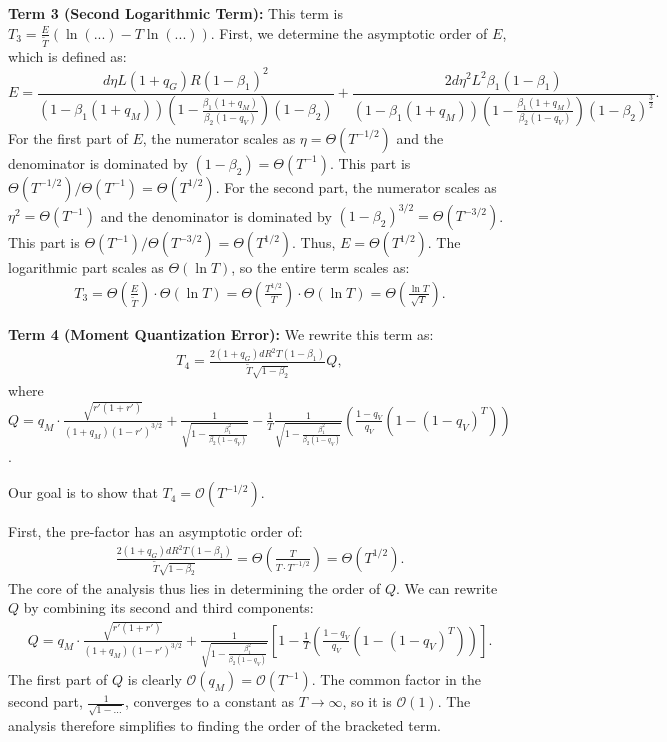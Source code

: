 \documentclass[11pt, letterpaper]{article}
\begin{document}
\textbf{Term 3 (Second Logarithmic Term):} This term is $T_3 = \frac{E}{\tilde{T}}\left(\ln(...) - T\ln(...)\right)$.
First, we determine the asymptotic order of $E$, which is defined as:
$$E=\frac{d\eta L(1+q_G)R(1-\beta_1)^2}{(1 - \beta_1(1+q_M))(1 - \frac{\beta_1(1+q_M)}{\beta_2(1-q_V)})(1-\beta_2)}+\frac{2d\eta^2 L^2 \beta_1(1-\beta_1)}{(1 - \beta_1(1+q_M))(1 - \frac{\beta_1(1+q_M)}{\beta_2(1-q_V)})(1-\beta_2)^{\frac{3}{2}}}.$$
For the first part of $E$, the numerator scales as $\eta=\Theta(T^{-1/2})$ and the denominator is dominated by $(1-\beta_2)=\Theta(T^{-1})$. This part is $\Theta(T^{-1/2}) / \Theta(T^{-1}) = \Theta(T^{1/2})$. For the second part, the numerator scales as $\eta^2=\Theta(T^{-1})$ and the denominator is dominated by $(1-\beta_2)^{3/2}=\Theta(T^{-3/2})$. This part is $\Theta(T^{-1}) / \Theta(T^{-3/2}) = \Theta(T^{1/2})$. Thus, $E = \Theta(T^{1/2})$. The logarithmic part scales as $\Theta(\ln T)$, so the entire term scales as:
\begin{align*}
    T_3 = \Theta\left(\frac{E}{\tilde{T}}\right) \cdot \Theta(\ln T) = \Theta\left(\frac{T^{1/2}}{T}\right) \cdot \Theta(\ln T) = \Theta\left(\frac{\ln T}{\sqrt{T}}\right).
\end{align*}

\textbf{Term 4 (Moment Quantization Error):} We rewrite this term as:
\begin{align}\label{eq:QT_cal}
    T_4 = \frac{2(1+q_G)dR^2T(1-\beta_1)}{\tilde{T}\sqrt{1-\beta_2}}Q,
\end{align}
where $Q= q_M \cdot \frac{\sqrt{r'(1+r')}}{(1+q_M)(1-r')^{3/2}} + \frac{1}{\sqrt{1-\frac{\beta_1^2}{\beta_2(1-q_V)}}}-\frac{1}{T}\frac{1}{\sqrt{1-\frac{\beta_1^2}{\beta_2(1-q_V)}}} \left( \frac{1-q_V}{q_V}(1-(1-q_V)^T) \right)$.

Our goal is to show that $T_4 = \mathcal{O}(T^{-1/2})$.

First, the pre-factor has an asymptotic order of:
\begin{align*}
    \frac{2(1+q_G)dR^2T(1-\beta_1)}{\tilde{T}\sqrt{1-\beta_2}} = \Theta\left(\frac{T}{T \cdot T^{-1/2}}\right) = \Theta(T^{1/2}).
\end{align*}
The core of the analysis thus lies in determining the order of $Q$. We can rewrite $Q$ by combining its second and third components:
\begin{align*}
    Q = q_M  \cdot \frac{\sqrt{r'(1+r')}}{(1+q_M)(1-r')^{3/2}} + \frac{1}{\sqrt{1-\frac{\beta_1^2}{\beta_2(1-q_V)}}} \left[ 1 - \frac{1}{T} \left( \frac{1-q_V}{q_V}(1-(1-q_V)^T) \right) \right].
\end{align*}
The first part of $Q$ is clearly $\mathcal{O}(q_M) = \mathcal{O}(T^{-1})$. The common factor in the second part, $\frac{1}{\sqrt{1-\dots}}$, converges to a constant as $T \to \infty$, so it is $\mathcal{O}(1)$. The analysis therefore simplifies to finding the order of the bracketed term.
\end{document}
